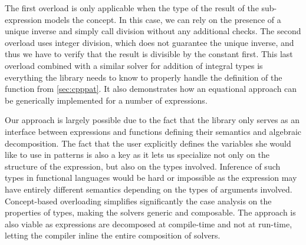 \noindent
The first overload is only applicable when the type of the result of the 
sub-expression models the  concept. In this case, we can rely on the 
presence of a unique inverse and simply call division without any additional 
checks. The second overload uses integer division, which does not guarantee the 
unique inverse, and thus we have to verify that the result is divisible by the 
constant first. This last overload combined with a similar solver for addition 
of integral types is everything the library needs to know to properly handle the 
definition of the  function from \textsection\ref{sec:cpppat}. It also 
demonstrates how an equational approach can be generically implemented for a 
number of expressions.

%
%

Our approach is largely possible due to the fact that the library only serves as 
an interface between expressions and functions defining their semantics and 
algebraic decomposition. The fact that the user explicitly defines the variables 
she would like to use in patterns is also a key as it lets us specialize not 
only on the structure of the expression, but also on the types involved. 
Inference of such types in functional languages would be hard or impossible as the 
expression may have entirely different semantics depending on the types of 
arguments involved. Concept-based overloading simplifies significantly the case 
analysis on the properties of types, making the solvers generic and composable.
The approach is also viable as expressions are decomposed at compile-time and 
not at run-time, letting the compiler inline the entire composition of solvers. 

